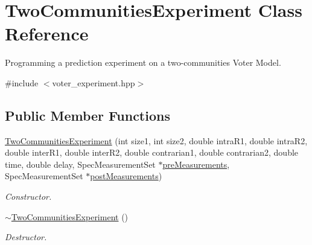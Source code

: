 \hypertarget{class_two_communities_experiment}{\section{Two\-Communities\-Experiment Class Reference}
\label{class_two_communities_experiment}
}


Programming a prediction experiment on a two-\/communities Voter Model.  




{\ttfamily \#include $<$voter\-\_\-experiment.\-hpp$>$}

\subsection*{Public Member Functions}
\begin{DoxyCompactItemize}
\item 
\hyperlink{class_two_communities_experiment_a9f4318b842f0ca4c297e78edd480efde}{Two\-Communities\-Experiment} (int size1, int size2, double intra\-R1, double intra\-R2, double inter\-R1, double inter\-R2, double contrarian1, double contrarian2, double time, double delay, Spec\-Measurement\-Set $\ast$\hyperlink{class_two_communities_experiment_a1e681dca94bf8bf967d0586acee25ac1}{pre\-Measurements}, Spec\-Measurement\-Set $\ast$\hyperlink{class_two_communities_experiment_a78016b6845b3752c0a83f09793653ecc}{post\-Measurements})
\begin{DoxyCompactList}\small\item\em Constructor. \end{DoxyCompactList}\item 
\hypertarget{class_two_communities_experiment_ad446d179a6caf0e8d53986c26f5b95d1}{\hyperlink{class_two_communities_experiment_ad446d179a6caf0e8d53986c26f5b95d1}{$\sim$\-Two\-Communities\-Experiment} ()}\label{class_two_communities_experiment_ad446d179a6caf0e8d53986c26f5b95d1}

\begin{DoxyCompactList}\small\item\em Destructor. \end{DoxyCompactList}\end{DoxyCompactItemize}
